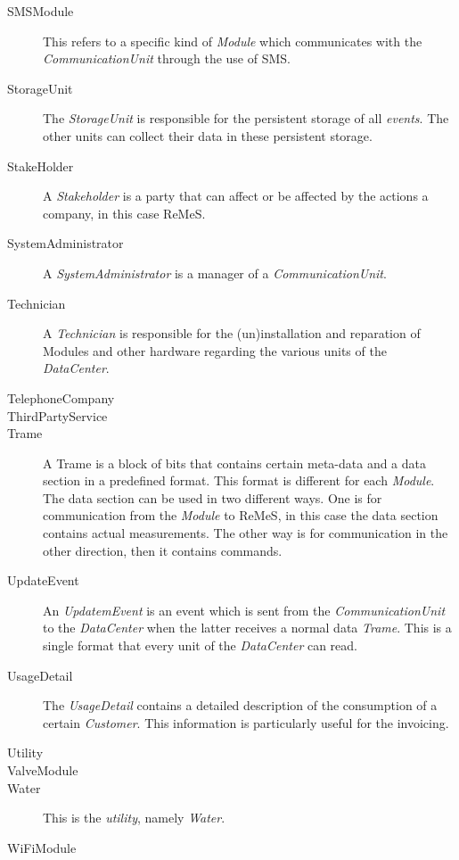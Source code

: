 \begin{description}
\item[SMSModule] This refers to a specific kind of \emph{Module} which
communicates with the \emph{CommunicationUnit} through the use of SMS.

\item[StorageUnit] The \emph{StorageUnit} is responsible for the persistent
storage of all \emph{events}. The other units can collect their data in these
persistent storage.

\item[StakeHolder]A \emph{Stakeholder} is a party that can affect or be
affected by the actions a company, in this case ReMeS.

\item[SystemAdministrator] A \emph{SystemAdministrator} is a manager of a
\emph{CommunicationUnit}. %

\item[Technician] A \emph{Technician} is responsible for the (un)installation
and reparation of Modules and other hardware regarding the various units of the
\emph{DataCenter}.

\item[TelephoneCompany]

\item[ThirdPartyService]

\item[Trame] A Trame is a block of bits that contains certain meta-data and
a data section in a predefined format. This format is different for each
\emph{Module}. The data section can be used in two different ways. One is for
communication from the \emph{Module} to ReMeS, in this case the data section
contains actual measurements. The other way is for communication in the other
direction, then it contains commands.

\item[UpdateEvent] An \emph{UpdatemEvent} is an event which is sent from the
\emph{CommunicationUnit} to the \emph{DataCenter} when the latter receives a
normal data \emph{Trame}. This is a single format that every unit of the
\emph{DataCenter} can read.

\item[UsageDetail] The \emph{UsageDetail} contains a detailed description of the
consumption of a certain \emph{Customer}. This information is particularly
useful for the invoicing.

\item[Utility]

\item[ValveModule]

\item[Water] This is the \emph{utility}, namely \emph{Water}.

\item[WiFiModule]

\end{description}